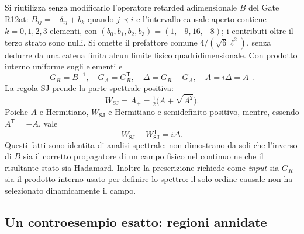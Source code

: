 \documentclass[11pt,a4paper]{article}
\begin{document}
Si riutilizza senza modificarlo l'operatore retarded adimensionale $B$ del Gate R12at: $B_{ij}=-\delta_{ij}+b_k$ quando $j\prec i$ e l'intervallo causale aperto contiene $k=0,1,2,3$ elementi, con $(b_0,b_1,b_2,b_3)=(1,-9,16,-8)$; i contributi oltre il terzo strato sono nulli. Si omette il prefattore comune $4/(\sqrt{6}\ell^2)$, senza dedurre da una catena finita alcun limite fisico quadridimensionale. Con prodotto interno uniforme sugli elementi e
\begin{equation}
  G_R=B^{-1},\quad G_A=G_R^{\mathsf T},\quad
  \Delta=G_R-G_A,\quad A=i\Delta=A^\dagger.
  \label{eq:r12az_retarded}
\end{equation}
La regola SJ prende la parte spettrale positiva:
\begin{equation}
  W_{\mathrm{SJ}}=A_+=\tfrac12\bigl(A+\sqrt{A^2}\bigr).
  \label{eq:r12az_positive}
\end{equation}
Poiche $A$ e Hermitiano, $W_{\mathrm{SJ}}$ e Hermitiano e semidefinito positivo, mentre, essendo $A^{\mathsf T}=-A$, vale
\begin{equation}
  W_{\mathrm{SJ}}-W_{\mathrm{SJ}}^{\mathsf T}=i\Delta.
  \label{eq:r12az_ccr}
\end{equation}
Questi fatti sono identita di analisi spettrale: non dimostrano da soli che l'inverso di $B$ sia il corretto propagatore di un campo fisico nel continuo ne che il risultante stato sia Hadamard. Inoltre la prescrizione richiede come \emph{input} sia $G_R$ sia il prodotto interno usato per definire lo spettro: il solo ordine causale non ha selezionato dinamicamente il campo.

\subsection{Un controesempio esatto: regioni annidate}
\end{document}
